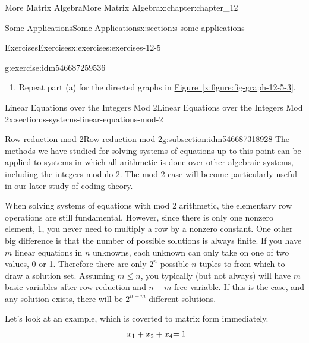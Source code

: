 \documentclass[oneside,10pt,]{book}
\newcommand{\xreffont}{\relax}
\numberwithin{equation}{section}
\begin{document}
\begin{chapterptx}{More Matrix Algebra}{}{More Matrix Algebra}{}{}{x:chapter:chapter_12}
\begin{sectionptx}{Some Applications}{}{Some Applications}{}{}{x:section:s-some-applications}
\begin{exercises-subsection}{Exercises}{}{Exercises}{}{}{x:exercises:exercises-12-5}
\begin{divisionexercise}{8}{}{}{g:exercise:idm546687259536}
\begin{enumerate}[label=(\alph*)]
\item{}Repeat part (a) for the directed graphs in \hyperref[x:figure:fig-graph-12-5-3]{Figure~{\xreffont\ref{x:figure:fig-graph-12-5-3}}}.%
\end{enumerate}
%
\end{divisionexercise}%
\end{exercises-subsection}
\end{sectionptx}
%
%
\typeout{************************************************}
\typeout{************************************************}
%
\begin{sectionptx}{Linear Equations over the Integers Mod 2}{}{Linear Equations over the Integers Mod 2}{}{}{x:section:s-systems-linear-equations-mod-2}
%
%
%
\typeout{************************************************}
\typeout{************************************************}
%
\begin{subsectionptx}{Row reduction mod 2}{}{Row reduction mod 2}{}{}{g:subsection:idm546687318928}
The methods we have studied for solving systems of equations up to this point can be applied to systems in which all arithmetic is done over other algebraic systems, including the integers modulo 2.    The mod 2 case will become particularly useful in our later study of coding theory.%
\par
When solving systems of equations with mod 2 arithmetic, the elementary row operations are still fundamental.  However, since there is only one nonzero element, 1, you never need to multiply a row by a nonzero constant.   One other big difference is that the number of possible solutions is always finite.  If you have \(m\) linear equations in \(n\) unknowns, each unknown can only take on one of two values, 0 or 1.   Therefore there are only \(2^n\) possible \(n\)-tuples to from which to draw a solution set.   Assuming \(m \leq n\), you typically (but not always) will have \(m\) basic variables after row-reduction and \(n-m\) free variable.  If this is the case, and any solution exists, there will be \(2^{n-m}\) different solutions.%
\par
Let's look at an example, which is coverted to matrix form immediately.%
\begin{equation*}
\begin{array}{r@{}r@{}r@{}r@{}r@{}r@{}r@{}r@{}r@{}r@{}r@{}r@{}}
x_1 &{}+{} &x_2 &      &    &{}+{} & x_4  &      &    &     &   &= 1 \\

\end{array}
\end{equation*}
\end{subsectionptx}
\end{sectionptx}
\end{chapterptx}
\end{document}
